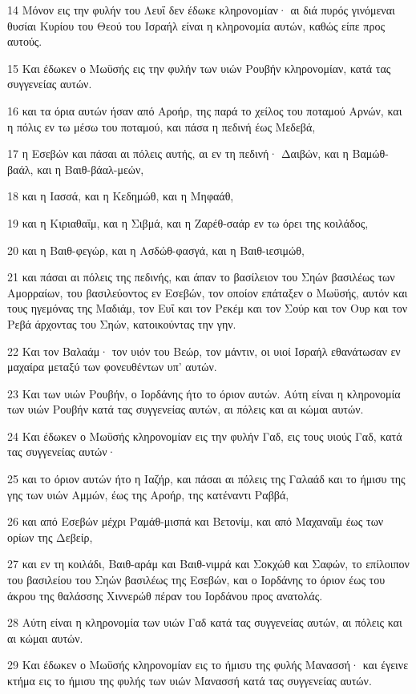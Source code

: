 \par 14 Μόνον εις την φυλήν του Λευΐ δεν έδωκε κληρονομίαν· αι διά πυρός γινόμεναι θυσίαι Κυρίου του Θεού του Ισραήλ είναι η κληρονομία αυτών, καθώς είπε προς αυτούς.
\par 15 Και έδωκεν ο Μωϋσής εις την φυλήν των υιών Ρουβήν κληρονομίαν, κατά τας συγγενείας αυτών.
\par 16 και τα όρια αυτών ήσαν από Αροήρ, της παρά το χείλος του ποταμού Αρνών, και η πόλις εν τω μέσω του ποταμού, και πάσα η πεδινή έως Μεδεβά,
\par 17 η Εσεβών και πάσαι αι πόλεις αυτής, αι εν τη πεδινή· Δαιβών, και η Βαμώθ-βαάλ, και η Βαιθ-βάαλ-μεών,
\par 18 και η Ιασσά, και η Κεδημώθ, και η Μηφαάθ,
\par 19 και η Κιριαθαΐμ, και η Σιβμά, και η Ζαρέθ-σαάρ εν τω όρει της κοιλάδος,
\par 20 και η Βαιθ-φεγώρ, και η Ασδώθ-φασγά, και η Βαιθ-ιεσιμώθ,
\par 21 και πάσαι αι πόλεις της πεδινής, και άπαν το βασίλειον του Σηών βασιλέως των Αμορραίων, του βασιλεύοντος εν Εσεβών, τον οποίον επάταξεν ο Μωϋσής, αυτόν και τους ηγεμόνας της Μαδιάμ, τον Ευΐ και τον Ρεκέμ και τον Σούρ και τον Ουρ και τον Ρεβά άρχοντας του Σηών, κατοικούντας την γην.
\par 22 Και τον Βαλαάμ· τον υιόν του Βεώρ, τον μάντιν, οι υιοί Ισραήλ εθανάτωσαν εν μαχαίρα μεταξύ των φονευθέντων υπ' αυτών.
\par 23 Και των υιών Ρουβήν, ο Ιορδάνης ήτο το όριον αυτών. Αύτη είναι η κληρονομία των υιών Ρουβήν κατά τας συγγενείας αυτών, αι πόλεις και αι κώμαι αυτών.
\par 24 Και έδωκεν ο Μωϋσής κληρονομίαν εις την φυλήν Γαδ, εις τους υιούς Γαδ, κατά τας συγγενείας αυτών·
\par 25 και το όριον αυτών ήτο η Ιαζήρ, και πάσαι αι πόλεις της Γαλαάδ και το ήμισυ της γης των υιών Αμμών, έως της Αροήρ, της κατέναντι Ραββά,
\par 26 και από Εσεβών μέχρι Ραμάθ-μισπά και Βετονίμ, και από Μαχαναΐμ έως των ορίων της Δεβείρ,
\par 27 και εν τη κοιλάδι, Βαιθ-αράμ και Βαιθ-νιμρά και Σοκχώθ και Σαφών, το επίλοιπον του βασιλείου του Σηών βασιλέως της Εσεβών, και ο Ιορδάνης το όριον έως του άκρου της θαλάσσης Χιννερώθ πέραν του Ιορδάνου προς ανατολάς.
\par 28 Αύτη είναι η κληρονομία των υιών Γαδ κατά τας συγγενείας αυτών, αι πόλεις και αι κώμαι αυτών.
\par 29 Και έδωκεν ο Μωϋσής κληρονομίαν εις το ήμισυ της φυλής Μανασσή· και έγεινε κτήμα εις το ήμισυ της φυλής των υιών Μανασσή κατά τας συγγενείας αυτών.
